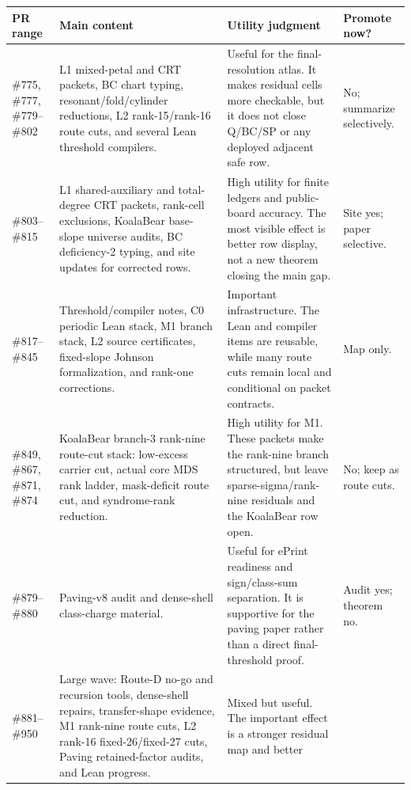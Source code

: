 \documentclass[a4paper,11pt]{amsart}
\begin{document}
\scriptsize
\begin{longtable}{>{\raggedright\arraybackslash}p{}
                  >{\raggedright\arraybackslash}p{}
                  >{\raggedright\arraybackslash}p{}
                  >{\raggedright\arraybackslash}p{}}
\toprule
PR range & Main content & Utility judgment & Promote now?\\
\midrule
\endhead
\#775, \#777, \#779--\#802 &
L1 mixed-petal and CRT packets, BC chart typing, resonant/fold/cylinder
reductions, L2 rank-15/rank-16 route cuts, and several Lean threshold
compilers. &
Useful for the final-resolution atlas.  It makes residual cells more
checkable, but it does not close Q/BC/SP or any deployed adjacent safe row. &
No; summarize selectively.\\
\addlinespace
\#803--\#815 &
L1 shared-auxiliary and total-degree CRT packets, rank-cell exclusions,
KoalaBear base-slope universe audits, BC deficiency-2 typing, and site updates
for corrected rows. &
High utility for finite ledgers and public-board accuracy.  The most visible
effect is better row display, not a new theorem closing the main gap. &
Site yes; paper selective.\\
\addlinespace
\#817--\#845 &
Threshold/compiler notes, C0 periodic Lean stack, M1 branch stack, L2
source certificates, fixed-slope Johnson formalization, and rank-one
corrections. &
Important infrastructure.  The Lean and compiler items are reusable, while
many route cuts remain local and conditional on packet contracts. &
Map only.\\
\addlinespace
\#849, \#867, \#871, \#874 &
KoalaBear branch-3 rank-nine route-cut stack: low-excess carrier cut, actual
core MDS rank ladder, mask-deficit route cut, and syndrome-rank reduction. &
High utility for M1.  These packets make the rank-nine branch structured, but
leave sparse-sigma/rank-nine residuals and the KoalaBear row open. &
No; keep as route cuts.\\
\addlinespace
\#879--\#880 &
Paving-v8 audit and dense-shell class-charge material. &
Useful for ePrint readiness and sign/class-sum separation.  It is supportive
for the paving paper rather than a direct final-threshold proof. &
Audit yes; theorem no.\\
\addlinespace
\#881--\#950 &
Large wave: Route-D no-go and recursion tools, dense-shell repairs,
transfer-shape evidence, M1 rank-nine route cuts, L2 rank-16 fixed-26/fixed-27
cuts, Paving retained-factor audits, and Lean progress. &
Mixed but useful.  The important effect is a stronger residual map and better

\end{longtable}
\end{document}
